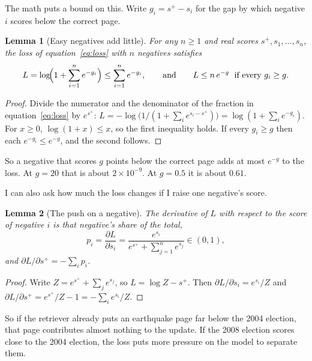 \documentclass[11pt]{article}
\newtheorem{lemma}{Lemma}
\theoremstyle{definition}
\begin{document}
The math puts a bound on this. Write $g_i = s^{+} - s_i$ for the gap by which negative $i$ scores below the correct page.

\begin{lemma}[Easy negatives add little]
\label{lem:bound}
For any $n \ge 1$ and real scores $s^{+}, s_1, \dots, s_n$, the loss of equation~\ref{eq:loss} with $n$ negatives satisfies
\begin{equation}
  L = \log\!\Bigl(1 + \sum_{i=1}^{n} e^{-g_i}\Bigr) \le \sum_{i=1}^{n} e^{-g_i}, \qquad\text{and}\qquad L \le n\,e^{-g} \;\text{ if every } g_i \ge g.
  \label{eq:bound}
\end{equation}
\end{lemma}
\begin{proof}
Divide the numerator and the denominator of the fraction in equation~\ref{eq:loss} by $e^{s^{+}}$: $L = -\log\bigl(1 / (1 + \sum_i e^{s_i - s^{+}})\bigr) = \log(1 + \sum_i e^{-g_i})$. For $x \ge 0$, $\log(1 + x) \le x$, so the first inequality holds. If every $g_i \ge g$ then each $e^{-g_i} \le e^{-g}$, and the second follows.
\end{proof}

So a negative that scores $g$ points below the correct page adds at most $e^{-g}$ to the loss. At $g = 20$ that is about $2 \times 10^{-9}$. At $g = 0.5$ it is about $0.61$.

I can also ask how much the loss changes if I raise one negative's score.

\begin{lemma}[The push on a negative]
\label{lem:push}
The derivative of $L$ with respect to the score of negative $i$ is that negative's share of the total,
\begin{equation}
  p_i = \frac{\partial L}{\partial s_i} = \frac{e^{s_i}}{e^{s^{+}} + \sum_{j=1}^{n} e^{s_j}} \in (0, 1),
  \label{eq:push}
\end{equation}
and $\partial L / \partial s^{+} = -\sum_i p_i$.
\end{lemma}
\begin{proof}
Write $Z = e^{s^{+}} + \sum_j e^{s_j}$, so $L = \log Z - s^{+}$. Then $\partial L/\partial s_i = e^{s_i}/Z$ and $\partial L/\partial s^{+} = e^{s^{+}}/Z - 1 = -\sum_i e^{s_i}/Z$.
\end{proof}

So if the retriever already puts an earthquake page far below the 2004 election, that page contributes almost nothing to the update. If the 2008 election scores close to the 2004 election, the loss puts more pressure on the model to separate them.
\end{document}
